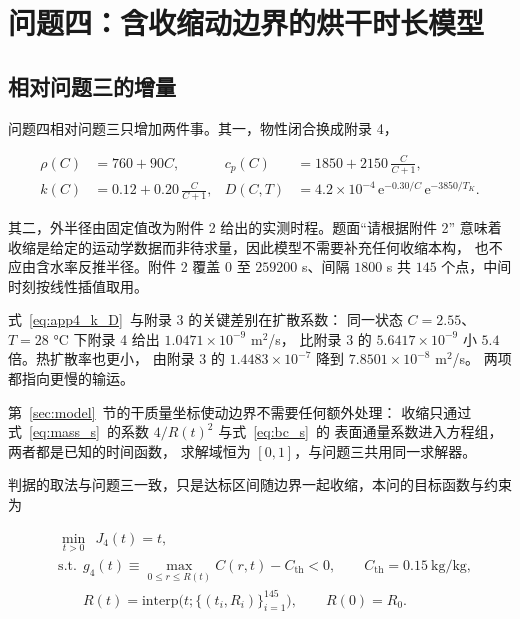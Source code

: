 \section{问题四：含收缩动边界的烘干时长模型}
\label{sec:p4}

\subsection{相对问题三的增量}

问题四相对问题三只增加两件事。其一，物性闭合换成附录 4，

\begin{align}
\rho(C)&=760+90C, &
c_p(C)&=1850+2150\,\frac{C}{C+1},
\label{eq:app4_rho_cp}\\
k(C)&=0.12+0.20\,\frac{C}{C+1}, &
D(C,T)&=4.2\times10^{-4}\,\mathrm{e}^{-0.30/C}\,\mathrm{e}^{-3850/T_K}.
\label{eq:app4_k_D}
\end{align}

其二，外半径由固定值改为附件 2 给出的实测时程。题面“请根据附件 2”
意味着收缩是给定的运动学数据而非待求量，因此模型不需要补充任何收缩本构，
也不应由含水率反推半径。附件 2 覆盖 $0$ 至 $259200$ s、间隔 $1800$ s 共
$145$ 个点，中间时刻按线性插值取用。

式~\eqref{eq:app4_k_D}~与附录 3 的关键差别在扩散系数：
同一状态 $C=2.55$、$T=28$ °C 下附录 4 给出 $1.0471\times10^{-9}$ m$^2$/s，
比附录 3 的 $5.6417\times10^{-9}$ 小 $5.4$ 倍。热扩散率也更小，
由附录 3 的 $1.4483\times10^{-7}$ 降到 $7.8501\times10^{-8}$ m$^2$/s。
两项都指向更慢的输运。

第~\ref{sec:model}~节的干质量坐标使动边界不需要任何额外处理：
收缩只通过式~\eqref{eq:mass_s}~的系数 $4/R(t)^2$ 与式~\eqref{eq:bc_s}~的
表面通量系数进入方程组，两者都是已知的时间函数，
求解域恒为 $[0,1]$，与问题三共用同一求解器。

判据的取法与问题三一致，只是达标区间随边界一起收缩，本问的目标函数与约束为

\begin{equation}
\begin{aligned}
&\min_{t>0}\ \ J_4(t)=t,\\
&\mathrm{s.t.}\ \ g_4(t)\equiv\max_{0\le r\le R(t)}C(r,t)-C_{\mathrm{th}}<0,
\qquad C_{\mathrm{th}}=0.15~\text{kg/kg},\\
&\phantom{\mathrm{s.t.}}\ \ R(t)=\mathrm{interp}\bigl(t;\{(t_i,R_i)\}_{i=1}^{145}\bigr),
\qquad R(0)=R_0 .
\end{aligned}
\label{eq:p4_obj}
\end{equation}

